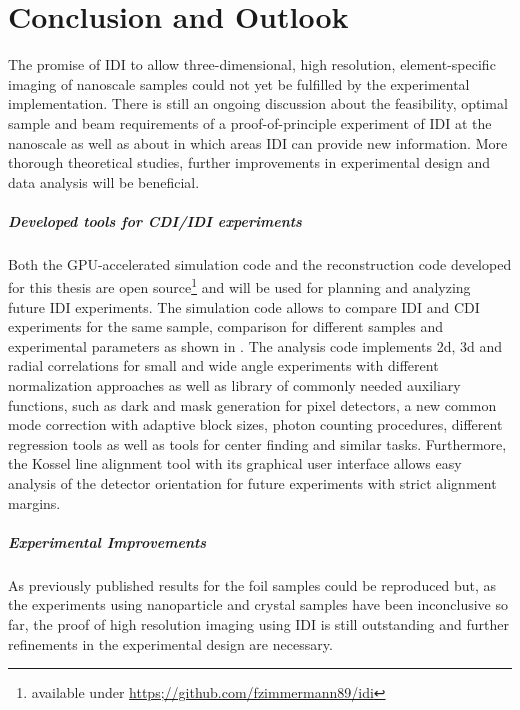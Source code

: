 \chapter{Conclusion and Outlook}
The promise of IDI to allow three-dimensional, high resolution, element-specific imaging of nanoscale samples could not yet be fulfilled by the experimental implementation. There is still an ongoing discussion about the feasibility, optimal sample and beam requirements of a proof-of-principle experiment of IDI at the nanoscale as well as about in which areas IDI can provide new information. More thorough theoretical studies, further improvements in experimental design and data analysis will be beneficial.

\paragraph{Developed tools for CDI/IDI experiments}
Both the GPU-accelerated simulation code and the reconstruction code developed for this thesis are open source\footnote{available under \url{https;//github.com/fzimmermann89/idi}} and will be used for planning and analyzing future IDI experiments. The simulation code allows to compare IDI and CDI experiments for the same sample, comparison for different samples and experimental parameters as shown in .
The analysis code implements 2d, 3d and radial correlations for small and wide angle experiments with different normalization approaches as well as library of commonly needed auxiliary functions, such as dark and mask generation for pixel detectors, a new common mode correction with adaptive block sizes, photon counting procedures, different regression tools as well as tools for center finding and similar tasks.
Furthermore, the Kossel line alignment tool with its graphical user interface allows easy analysis of the detector orientation for future experiments with strict alignment margins.

\paragraph{Experimental Improvements}
As previously published results for the foil samples could be reproduced but, as the experiments using nanoparticle and crystal samples have been inconclusive so far, the proof of high resolution imaging using IDI is still outstanding and further refinements in the experimental design are necessary.


